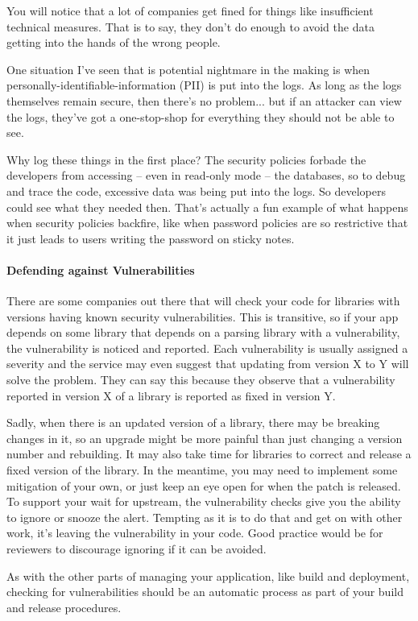 \documentclass[a4paper]{report}
\begin{document}
You will notice that a lot of companies get fined for things like insufficient technical measures. That is to say, they don't do enough to avoid the data getting into the hands of the wrong people.

One situation I've seen that is potential nightmare in the making is when personally-identifiable-information (PII) is put into the logs. As long as the logs themselves remain secure, then there's no problem... but if an attacker can view the logs, they've got a one-stop-shop for everything they should not be able to see.

Why log these things in the first place?  The security policies forbade the developers from accessing -- even in read-only mode -- the databases, so to debug and trace the code, excessive data was being put into the logs. So developers could see what they needed then. That's actually a fun example of what happens when security policies backfire, like when password policies are so restrictive that it just leads to users writing the password on sticky notes.


\paragraph{Defending against Vulnerabilities}
There are some companies out there that will check your code for libraries with versions having known security vulnerabilities. This is transitive, so if your app depends on some library that depends on a parsing library with a vulnerability, the vulnerability is noticed and reported. Each vulnerability is usually assigned a severity and the service may even suggest that updating from version X to Y will solve the problem. They can say this because they observe that a vulnerability reported in version X of a library is reported as fixed in version Y. 

Sadly, when there is an updated version of a library, there may be breaking changes in it, so an upgrade might be more painful than just changing a version number and rebuilding. It may also take time for libraries to correct and release a fixed version of the library. In the meantime, you may need to implement some mitigation of your own, or just keep an eye open for when the patch is released. To support your wait for upstream, the vulnerability checks give you the ability to ignore or snooze the alert. Tempting as it is to do that and get on with other work, it's leaving the vulnerability in your code. Good practice would be for reviewers to discourage ignoring if it can be avoided.

As with the other parts of managing your application, like build and deployment, checking for vulnerabilities should be an automatic process as part of your build and release procedures. 










\end{document}
